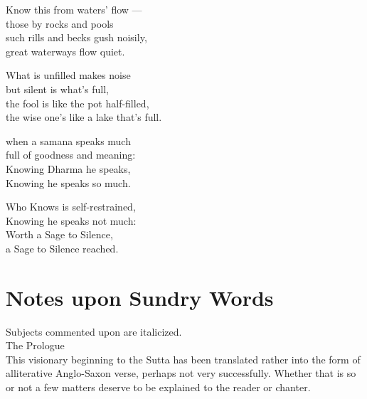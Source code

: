 \begin{MyDescription}{}
Know this from waters' flow —\\
those by rocks and pools\\
such rills and becks gush noisily,\\
great waterways flow quiet.
\end{MyDescription} 

\begin{MyDescription}{}
What is unfilled makes noise\\
but silent is what's full,\\
the fool is like the pot half-filled,\\
the wise one's like a lake that's full.
\end{MyDescription} 

\begin{MyDescription}{}
when a samana speaks much\\
full of goodness and meaning:\\
Knowing Dharma he speaks,\\
Knowing he speaks so much.
\end{MyDescription} 

\begin{MyDescription}{}
Who Knows is self-restrained,\\
Knowing he speaks not much:\\
Worth a Sage to Silence,\\
a Sage to Silence reached.
\end{MyDescription} 

\begin{MyDescription}[(Sn. 679-723)]{}
\end{MyDescription} 



   

\section{Notes upon Sundry Words}

Subjects commented upon are italicized.\\

The Prologue\\

This visionary beginning to the Sutta has been translated rather into the form of alliterative Anglo-Saxon verse, perhaps not very successfully. Whether that is so or not a few matters deserve to be explained to the reader or chanter.\\

